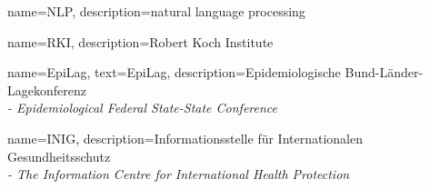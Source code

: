 \RequirePackage[square]{natbib}




\RequirePackage{amsthm}
\theoremstyle{definition}
\newtheorem{definition}{Definition}[chapter]
\newtheorem{example}{Example}[chapter]




\RequirePackage[small,bf]{caption}




\RequirePackage{subfig}





\graphicspath{{./Figures/}}









{
  name={NLP},
  description={natural language processing}
}

{
  name={RKI},
  description={Robert Koch Institute}
}

{
  name={EpiLag},
  text={EpiLag},
  description={Epidemiologische Bund-L\"ander-Lagekonferenz \\
               \textit{- Epidemiological Federal State-State Conference}}
}

{
  name={INIG},
  description={Informationsstelle für Internationalen Gesundheitsschutz\\
  \textit{- The Information Centre for International Health Protection}}
}

